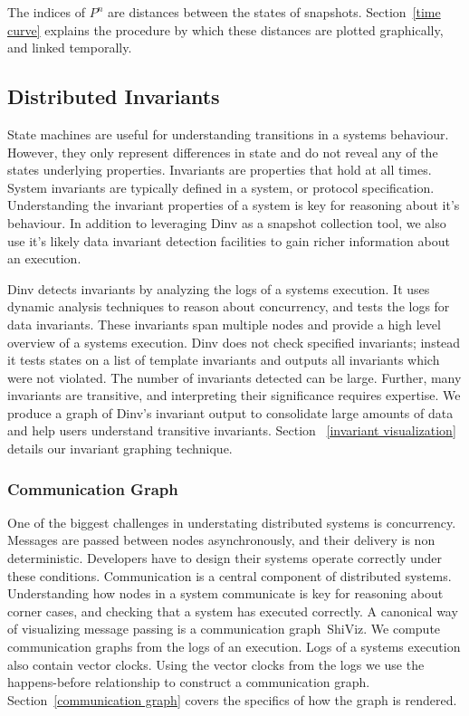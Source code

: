 The indices of $P^n$ are distances between the states of snapshots.
Section~\ref{time curve} explains the procedure by which these distances are
plotted graphically, and linked temporally.

\subsection{Distributed Invariants}

State machines are useful for understanding transitions in a systems behaviour.
However, they only represent differences in state and do not reveal any of the
states underlying properties. Invariants are properties that hold at all times.
System invariants are typically defined in a system, or protocol specification.
Understanding the invariant properties of a system is key for reasoning about
it's behaviour. In addition to leveraging Dinv as a snapshot collection tool,
we also use it's likely data invariant detection facilities to gain richer information
about an execution.

Dinv detects invariants by analyzing the logs of a systems execution. It uses
dynamic analysis techniques to reason about concurrency, and tests the logs for
data invariants. These invariants span multiple nodes and provide a high level
overview of a systems execution. Dinv does not check specified invariants;
instead it tests states on a list of template  invariants and outputs all
invariants which were not violated. The number of invariants detected can be
large. Further, many invariants are transitive, and interpreting their
significance requires expertise. We produce a graph of Dinv's invariant output
to consolidate large amounts of data and help users understand transitive
invariants. Section ~\ref{invariant visualization} details our invariant
graphing technique.

\subsubsection{Communication Graph}

One of the biggest challenges in understating distributed systems is
concurrency. Messages are passed between nodes asynchronously, and their delivery
is non deterministic. Developers have to design their systems operate correctly
under these conditions. Communication is a central component of distributed
systems. Understanding how nodes in a system communicate is key for reasoning
about corner cases, and checking that a system has executed correctly. A
canonical way of visualizing message passing is a communication
graph~\cite{lamport}{ShiViz}. We compute communication graphs from the logs of
an execution. Logs of a systems execution also contain vector clocks. Using the
vector clocks from the logs we use the happens-before relationship to construct
a communication graph. Section~\ref{communication graph} covers the specifics
of how the graph is rendered.

